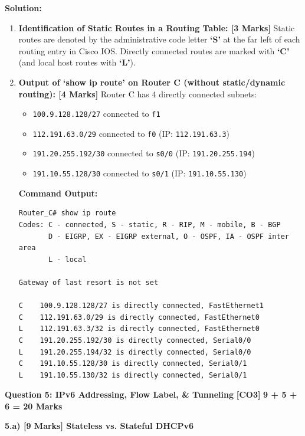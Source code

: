 \documentclass[11pt,a4paper]{article}
\newcommand{\questionheader}[3]{
    \vspace{0.35cm}
    \noindent\colorbox{qboxbg}{
        \parbox{\dimexpr\textwidth-2\fboxsep\relax}{
            \textbf{\textcolor{primary}{\large #1}} \hfill \textbf{\textcolor{accent}{[#2]}} \hfill \textbf{\textcolor{secondary}{#3 Marks}}
        }
    }
    \vspace{0.15cm}
}
\begin{document}
\textbf{Solution:}
\begin{enumerate}
    \item \textbf{Identification of Static Routes in a Routing Table: [3 Marks]}
    Static routes are denoted by the administrative code letter \textbf{`S'} at the far left of each routing entry in Cisco IOS. Directly connected routes are marked with \textbf{`C'} (and local host routes with \textbf{`L'}).
    
    \item \textbf{Output of `show ip route' on Router C (without static/dynamic routing): [4 Marks]}
    Router C has 4 directly connected subnets:
    \begin{itemize}
        \item \texttt{100.9.128.128/27} connected to \texttt{f1}
        \item \texttt{112.191.63.0/29} connected to \texttt{f0} (IP: \texttt{112.191.63.3})
        \item \texttt{191.20.255.192/30} connected to \texttt{s0/0} (IP: \texttt{191.20.255.194})
        \item \texttt{191.10.55.128/30} connected to \texttt{s0/1} (IP: \texttt{191.10.55.130})
    \end{itemize}

\textbf{Command Output:}
\begin{verbatim}
Router_C# show ip route
Codes: C - connected, S - static, R - RIP, M - mobile, B - BGP
       D - EIGRP, EX - EIGRP external, O - OSPF, IA - OSPF inter area
       L - local

Gateway of last resort is not set

C    100.9.128.128/27 is directly connected, FastEthernet1
C    112.191.63.0/29 is directly connected, FastEthernet0
L    112.191.63.3/32 is directly connected, FastEthernet0
C    191.20.255.192/30 is directly connected, Serial0/0
L    191.20.255.194/32 is directly connected, Serial0/0
C    191.10.55.128/30 is directly connected, Serial0/1
L    191.10.55.130/32 is directly connected, Serial0/1
\end{verbatim}
\end{enumerate}

\newpage
\questionheader{Question 5: IPv6 Addressing, Flow Label, \& Tunneling}{CO3}{9 + 5 + 6 = 20}

\textbf{5.a) [9 Marks] Stateless vs. Stateful DHCPv6}
\end{document}
